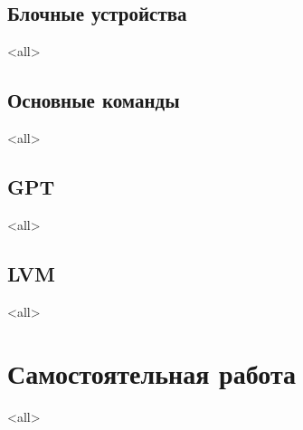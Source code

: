 \section{Блочные устройства}
\mode<all>{}
\section{Основные команды}
\mode<all>{}
\section{GPT}
\mode<all>{}
\section{LVM}
\mode<all>{}

\chapter{Самостоятельная работа}
\mode<all>{}


